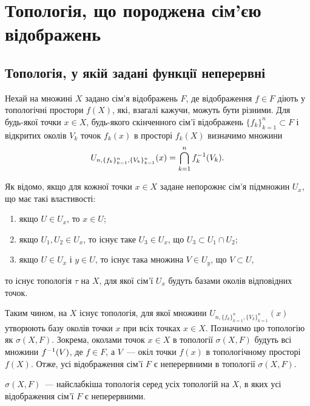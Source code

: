 \newcommand{\InducedNeighbourhood}[1]{U_{n,\{f_k\}_{k=1}^n,\{V_k\}_{k=1}^n}(#1)}

\chapter{Топологія, що породжена сім'єю відображень}

\section{Топологія, у якій задані функції неперервні}

Нехай на множині $X$ задано сім'я відображень $F$, де відображення $f \in F$ діють у топологічні простори $f(X)$, які, взагалі кажучи, можуть бути різними. Для будь-якої точки $x \in X$, будь-якого скінченного сім'ї відображень $\{f_k\}_{k = 1}^n \subset F$ і відкритих околів $V_k$ точок $f_k(x)$ в просторі $f_k(X)$ визначимо множини
\begin{equation*}
    \InducedNeighbourhood{x} = \Bigcap_{k = 1}^n f_k\inv (V_k).
\end{equation*}

Як відомо, якщо для кожної точки $x \in X$ задане непорожнє сім'я підмножин $U_x$, що має такі властивості:
\begin{enumerate}
    \item якщо $U \in U_x$, то $x \in U$;
    \item якщо $U_1, U_2 \in U_x$, то існує таке $U_3 \in U_x$, що $U_3 \subset U_1 \cap U_2$;
    \item якщо $U \in U_x$ і $y \in U$, то існує така множина $V \in U_y$, що $V \subset U$,
\end{enumerate}
то існує топологія $\tau$ на $X$, для якої сім'ї $U_x$ будуть базами околів відповідних точок. 

Таким чином, на $X$ існує топологія, для якої множини $\InducedNeighbourhood{x}$ утворюють базу околів точки $x$ при всіх точках $x \in X$. Позначимо цю топологію як $\sigma (X, F)$. Зокрема, околами точок $x \in X$ в топології $\sigma (X, F)$ будуть всі множини $f^{-1} (V)$, де $f \in F$, а $V$~--- окіл точки $f(x)$ в топологічному просторі $f(X)$. Отже, усі відображення сім'ї $F$ є неперервними в топології $\sigma (X, F)$.

\begin{theorem}
    $\sigma (X, F)$~--- найслабкіша топологія серед усіх топологій на $X$, в яких усі відображення сім'ї $F$ є неперервними.
\end{theorem}

